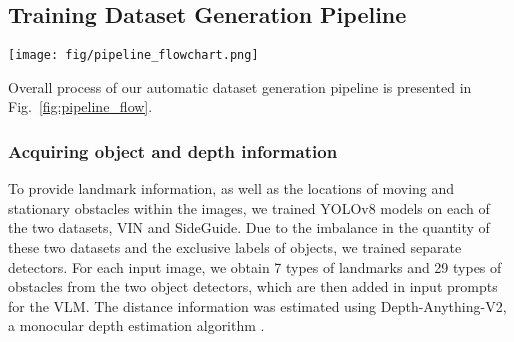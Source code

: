 \vspace{-8pt}
\subsection{Training Dataset Generation Pipeline}
\label{sec:pipeline}
\vspace{-2pt}

\begin{figure*}[ht]
    \centering
    \texttt{[image: fig/pipeline\_flowchart.png]} %
    \vspace{-8mm}
    \caption{Our automatic dataset generation pipeline that focuses on the virtual path to the destination in 3D space and the surroundings. Given an input image and a goal position, we extract object locations and generate a depth map to identify walkable areas and surrounding environments, which are then utilized as inputs for a VLM. 
    Subsequently, we generate five distinct sentences through separate queries and integrate them to produce a recommendation statement on whether visually impaired individuals can traverse the specified path with a brief reason. }
    \label{fig:pipeline_flow}
    \vspace{-6mm}
\end{figure*}

Overall process of our automatic dataset generation pipeline is presented in Fig.~\ref{fig:pipeline_flow}.

\subsubsection{Acquiring object and depth information}
\label{sec:object_detection}

To provide landmark information, as well as the locations of moving and stationary obstacles within the images, we trained YOLOv8 models \cite{Jocher_Ultralytics_YOLO_2023} on each of the two datasets, VIN and SideGuide. 
Due to the imbalance in the quantity of these two datasets and the exclusive labels of objects, we trained separate detectors. For each input image, we obtain 7 types of landmarks and 29 types of obstacles from the two object detectors, which are then added in input prompts for the VLM.
The distance information was estimated using Depth-Anything-V2, a monocular depth estimation algorithm \cite{depth_anything_v2}. 

